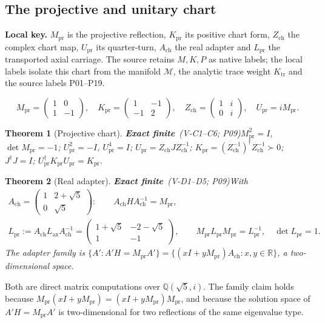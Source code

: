 \documentclass[11pt,a4paper]{article}
\newcommand{\RR}{\mathbb{R}}\newcommand{\QQ}{\mathbb{Q}}\newcommand{\ZZ}{\mathbb{Z}}
\newcommand{\Lax}{L_{\mathrm{ax}}}\newcommand{\Lpr}{L_{\mathrm{pr}}}
\newcommand{\Mpr}{M_{\mathrm{pr}}}\newcommand{\Kpr}{K_{\mathrm{pr}}}\newcommand{\Upr}{U_{\mathrm{pr}}}
\newcommand{\Ach}{A_{\mathrm{ch}}}\newcommand{\Zch}{Z_{\mathrm{ch}}}
\newcommand{\st}[1]{\textsf{\small\textbf{#1}}}
\newcommand{\Sfin}{\st{Exact finite}}\newcommand{\Sder}{\st{Exact derived}}
\newcommand{\lkey}[1]{\par\noindent\textbf{Local key.} #1\par\smallskip}
\theoremstyle{plain}
\newtheorem{thm}{Theorem}[section]
\theoremstyle{definition}
\theoremstyle{remark}
\begin{document}
\subsection{The projective and unitary chart}
\lkey{$\Mpr$ is the projective reflection, $\Kpr$ its positive chart form, $\Zch$ the complex chart map, $\Upr$ its quarter-turn, $\Ach$ the real adapter and $\Lpr$ the transported axial carriage. The source retains $M,K,P$ as native labels; the local labels isolate this chart from the manifold $\mathcal M$, the analytic trace weight $K_{\mathrm{tr}}$ and the source labels P01--P19.}
\[
\Mpr=\begin{pmatrix}1&0\\1&-1\end{pmatrix},\quad
\Kpr=\begin{pmatrix}1&-1\\-1&2\end{pmatrix},\quad
\Zch=\begin{pmatrix}1&i\\0&i\end{pmatrix},\quad
\Upr=i\Mpr .
\]
\begin{thm}[Projective chart]\Sfin\ \textit{(V-C1--C6; P09)}\label{thm:proj}
$\Mpr^2=I$, $\det\Mpr=-1$; $\Upr^2=-I$, $\Upr^4=I$; $\Upr=\Zch J\Zch^{-1}$; $\Kpr=(\Zch^{-1})^{\dagger}\Zch^{-1}\succ0$; $J^{\dagger}J=I$; $\Upr^{\dagger}\Kpr\Upr=\Kpr$.
\end{thm}
\begin{thm}[Real adapter]\Sfin\ \textit{(V-D1--D5; P09)}\label{thm:adapter}
With
\[
\begin{gathered}
\Ach=\begin{pmatrix}1&2+\sqrt5\\0&\sqrt5\end{pmatrix}:\qquad \Ach H\Ach^{-1}=\Mpr,\\[2pt]
\Lpr:=\Ach\Lax\Ach^{-1}=\begin{pmatrix}1+\sqrt5&-2-\sqrt5\\1&-1\end{pmatrix},\qquad \Mpr\Lpr\Mpr=\Lpr^{-1},\quad\det\Lpr=1 .
\end{gathered}
\]
The adapter family is $\{A':A'H=\Mpr A'\}=\{(x I+y\Mpr)\Ach: x,y\in\RR\}$, a two-dimensional space.
\end{thm}
Both are direct matrix computations over $\QQ(\sqrt5,i)$. The family claim holds because $\Mpr(xI+y\Mpr)=(xI+y\Mpr)\Mpr$, and because the solution space of $A'H=\Mpr A'$ is two-dimensional for two reflections of the same eigenvalue type.
\end{document}
